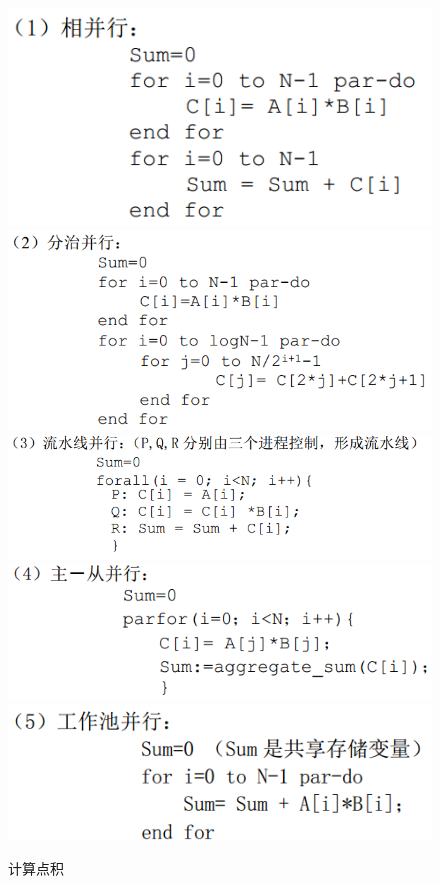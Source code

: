 \documentclass[UTF8,a4paper]{ctexart}
\begin{document}
\begin{figure}[H]
  \centering
  \includegraphics[scale = 0.3]{assets/ParallelComputing_b2389.png}
  \includegraphics[scale = 0.3]{assets/ParallelComputing_d61b4.png}
  \includegraphics[scale = 0.3]{assets/ParallelComputing_d02ee.png}
  \includegraphics[scale = 0.3]{assets/ParallelComputing_1c40a.png}
  \includegraphics[scale = 0.3]{assets/ParallelComputing_66d2d.png}
  \caption{计算点积}
\end{figure}
\end{document}
